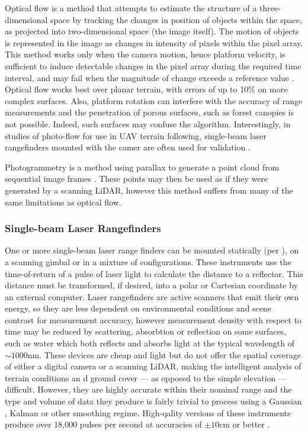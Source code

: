 \documentclass[10pt]{report}
\begin{document}
Optical flow is a method that attempts to estimate the structure of a three-dimensional space by tracking the changes in position of objects within the space, as projected into two-dimensional space (the image itself). The motion of objects is represented in the image as changes in intensity of pixels within the pixel array. This method works only when the camera motion, hence platform velocity, is sufficient to induce detectable changes in the pixel array during the required time interval, and may fail when the magnitude of change exceeds a reference value \cite{Srinivasan1994}. Optical flow works best over planar terrain, with errors of up to 10\% \cite{Campos2016} on more complex surfaces. Also, platform rotation can interfere with the accuracy of range measurements and the penetration of porous surfaces, such as forest canopies is not possible. Indeed, such surfaces may confuse the algorithm. Interestingly, in studies of photo-flow for use in UAV terrain following, single-beam laser rangefinders mounted with the camer are often used for validation \cite{Campos2016}.

Photogrammetry is a method using parallax to generate a point cloud from sequential image frames \cite{Carrivick2016}. These points may then be used as if they were generated by a scanning LiDAR, however this method suffers from many of the same limitations as optical flow.

\subsubsection{Single-beam Laser Rangefinders}

One or more single-beam laser range finders can be mounted statically (per \cite{Alqahtani2018}), on a scanning gimbal \cite{LightWare2017} or in a mixture of configurations. These instruments use the time-of-return of a pulse of laser light to calculate the distance to a reflector. This distance must be transformed, if desired, into a polar or Cartesian coordinate by an external computer. Laser rangefinders are active scanners that emit their own energy, so they are less dependent on environmental conditions and scene contrast for measurement accuracy, however measurement density with respect to time may be reduced by scattering, absorbtion or reflection on some surfaces, such as water which both reflects and absorbs light at the typical wavelength of $\sim1000\si{\nm}$. These devices are cheap and light but do not offer the spatial coverage of either a digital camera or a scanning LiDAR, making the intelligent analysis of terrain conditions an   d ground cover --- as opposed to the simple elevation --- difficult. However, they are highly accurate within their nominal range \cite{Campos2016} and the type and volume of data they produce is fairly trivial to process using a Gaussian \cite{Alqahtani2018}, Kalman \cite{Kalman1960} or other smoothing regime. High-qality versions of these instruments produce over 18,000 pulses per second at accuracies of $\pm10\si{\cm}$ or better \cite{LightWare2016}.
\end{document}
